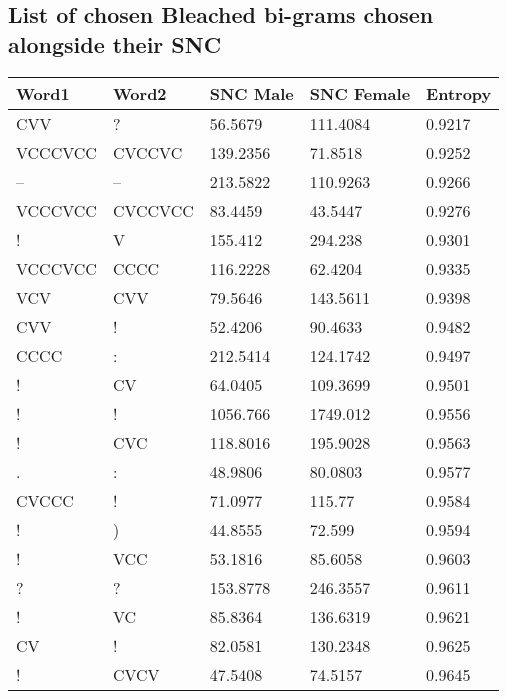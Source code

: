\subsection*{List of chosen Bleached bi-grams chosen alongside their SNC}
\begin{table}[H]
	\small
	\begin{tabular}{@{}lllll@{}}
		\toprule
		Word1   & Word2   & SNC Male & SNC Female & Entropy \\ \midrule
		CVV     & ?       & 56.5679       & 111.4084        & 0.9217  \\
		VCCCVCC & CVCCVC  & 139.2356      & 71.8518         & 0.9252  \\
		--      & --      & 213.5822      & 110.9263        & 0.9266  \\
		VCCCVCC & CVCCVCC & 83.4459       & 43.5447         & 0.9276  \\
		!       & V       & 155.412       & 294.238         & 0.9301  \\
		VCCCVCC & CCCC    & 116.2228      & 62.4204         & 0.9335  \\
		VCV     & CVV     & 79.5646       & 143.5611        & 0.9398  \\
		CVV     & !       & 52.4206       & 90.4633         & 0.9482  \\
		CCCC    & :       & 212.5414      & 124.1742        & 0.9497  \\
		!       & CV      & 64.0405       & 109.3699        & 0.9501  \\
		!       & !       & 1056.766      & 1749.012        & 0.9556  \\
		!       & CVC     & 118.8016      & 195.9028        & 0.9563  \\
		.       & :       & 48.9806       & 80.0803         & 0.9577  \\
		CVCCC   & !       & 71.0977       & 115.77          & 0.9584  \\
		!       & )       & 44.8555       & 72.599          & 0.9594  \\
		!       & VCC     & 53.1816       & 85.6058         & 0.9603  \\
		?       & ?       & 153.8778      & 246.3557        & 0.9611  \\
		!       & VC      & 85.8364       & 136.6319        & 0.9621  \\
		CV      & !       & 82.0581       & 130.2348        & 0.9625  \\
		!       & CVCV    & 47.5408       & 74.5157         & 0.9645  \\

\end{tabular}
\end{table}

